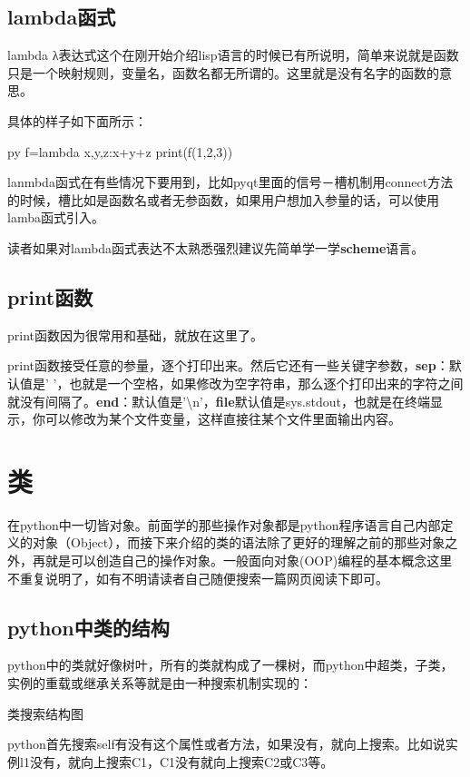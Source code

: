 \documentclass[12pt,oneside]{book}
\begin{document}
\begin{common-format}
\section{lambda函式}
lambda
λ表达式这个在刚开始介绍lisp语言的时候已有所说明，简单来说就是函数只是一个映射规则，变量名，函数名都无所谓的。这里就是没有名字的函数的意思。

具体的样子如下面所示：
\begin{xverbatim}[129]{py}
f=lambda x,y,z:x+y+z
print(f(1,2,3))
\end{xverbatim}

lanmbda函式在有些情况下要用到，比如pyqt里面的信号－槽机制用connect方法的时候，槽比如是函数名或者无参函数，如果用户想加入参量的话，可以使用lamba函式引入。

读者如果对lambda函式表达不太熟悉强烈建议先简单学一学\textbf{scheme}语言。

\section{print函数}
print函数因为很常用和基础，就放在这里了。

print函数接受任意的参量，逐个打印出来。然后它还有一些关键字参数，\textbf{sep}：默认值是' '，也就是一个空格，如果修改为空字符串，那么逐个打印出来的字符之间就没有间隔了。\textbf{end}：默认值是'\textbackslash{}n'，\textbf{file}默认值是sys.stdout，也就是在终端显示，你可以修改为某个文件变量，这样直接往某个文件里面输出内容。





\chapter{类}
在python中一切皆对象。前面学的那些操作对象都是python程序语言自己内部定义的对象（Object），而接下来介绍的类的语法除了更好的理解之前的那些对象之外，再就是可以创造自己的操作对象。一般面向对象(OOP)编程的基本概念这里不重复说明了，如有不明请读者自己随便搜索一篇网页阅读下即可。

\section{python中类的结构}
python中的类就好像树叶，所有的类就构成了一棵树，而python中超类，子类，实例的重载或继承关系等就是由一种搜索机制实现的：
\begin{fig}{类搜索结构图}
\label{fig:类搜索结构图}
\end{fig}
python首先搜索self有没有这个属性或者方法，如果没有，就向上搜索。比如说实例l1没有，就向上搜索C1，C1没有就向上搜索C2或C3等。


\end{common-format}
\end{document}
